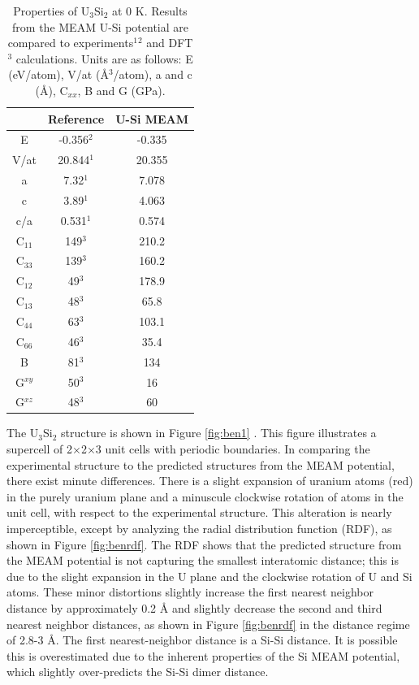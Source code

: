\documentclass[review]{elsarticle}
\begin{document}
\begin{table}[h!]
\caption{Properties of U$_{3}$Si$_{2}$ at 0 K.  Results from the MEAM U-Si potential are compared to experiments$^{1}$\cite{zachariasen1949}$^{2}$\cite{berche2009} and DFT$^{3}$\cite{noordhoek2016} calculations.  Units are as follows: E (eV/atom), V/at (\AA$^{3}$/atom), a and c (\AA), C$_{xx}$, B and G (GPa). }\label{tab:ben5}
\begin{center}
\begin{tabular}{|c|c|c|}
     \hline
      & Reference & U-Si MEAM  \\
     \hline
     E & -0.356$^{2}$ & -0.335 \\
     V/at & 20.844$^{1}$ & 20.355 \\
     a & 7.32$^{1}$ & 7.078 \\
     c & 3.89$^{1}$ & 4.063 \\
     c/a & 0.531$^{1}$ & 0.574 \\
     C$_{11}$ & 149$^{3}$ & 210.2  \\
     C$_{33}$ & 139$^{3}$ & 160.2 \\
     C$_{12}$ & 49$^{3}$ & 178.9 \\
     C$_{13}$ & 48$^{3}$ & 65.8 \\
     C$_{44}$ & 63$^{3}$ & 103.1 \\
     C$_{66}$ & 46$^{3}$ & 35.4 \\
     B & 81$^{3}$ & 134 \\
     G$^{xy}$ & 50$^{3}$ & 16  \\
     G$^{xz}$ & 48$^{3}$ & 60 \\
     \hline
\end{tabular}
\end{center}
\label{default}
\end{table}%

The U$_{3}$Si$_{2}$ structure is shown in Figure \ref{fig:ben1} \cite{zachariasen1949}.  This figure illustrates a supercell of 2$\times$2$\times$3 unit cells with periodic boundaries.  In comparing the experimental structure to the predicted structures from the MEAM potential, there exist minute differences.  There is a slight expansion of uranium atoms (red) in the purely uranium plane and a minuscule clockwise rotation of atoms in the unit cell, with respect to the experimental structure.  This alteration is nearly imperceptible, except by analyzing the radial distribution function (RDF), as shown in Figure \ref{fig:benrdf}.  The RDF shows that the predicted structure from the MEAM potential is not capturing the smallest interatomic distance; this is due to the slight expansion in the U plane and the clockwise rotation of U and Si atoms.  These minor distortions slightly increase the first nearest neighbor distance by approximately 0.2 {\AA} and slightly decrease the second and third nearest neighbor distances, as shown in Figure \ref{fig:benrdf} in the distance regime of 2.8-3 {\AA}.  The first nearest-neighbor distance is a Si-Si distance.  It is possible this is overestimated due to the inherent properties of the Si MEAM potential, which slightly over-predicts the Si-Si dimer distance.  
\end{document}
